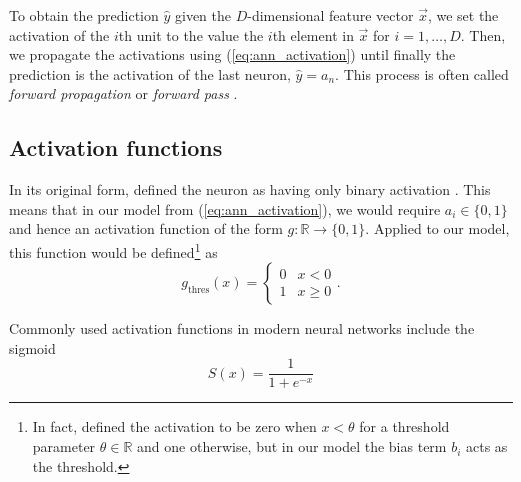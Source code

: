 To obtain the prediction $\hat{y}$ given the $D$-dimensional feature vector $\vec{x}$, we set the activation of the $i$th unit to the value the $i$th element in $\vec{x}$ for $i=1,\dots,D$.
Then, we propagate the activations using (\ref{eq:ann_activation}) until finally the prediction is the activation of the last neuron, $\hat{y}=a_n$.
This process is often called \textit{forward propagation} or \textit{forward pass} \cite{russell2010}.

\subsection{Activation functions}
\label{sec:activation_functions}
In its original form, \citeauthor{mcculloch1943} defined the neuron as having only binary activation \cite{mcculloch1943}. 
This means that in our model from (\ref{eq:ann_activation}), we would require $a_i \in \{0, 1\}$ and hence an activation function of the form $g: \mathbb{R} \rightarrow \{0, 1\}$.
Applied to our model, this function would be defined\footnote{In fact, \citeauthor{mcculloch1943} defined the activation to be zero when $x<\theta$ for a threshold parameter $\theta \in \mathbb{R}$ and one otherwise, but in our model the bias term $b_i$ acts as the threshold.} as
\begin{equation}
    \label{eq:thres_activation}
    g_\text{thres}(x) = \begin{cases} 
        0 & x < 0 \\
        1 & x \geq 0
    \end{cases}.
\end{equation}

Commonly used activation functions in modern neural networks include the sigmoid
\begin{equation}
    S(x) = \frac{1}{1 + e^{-x}}
\end{equation}

